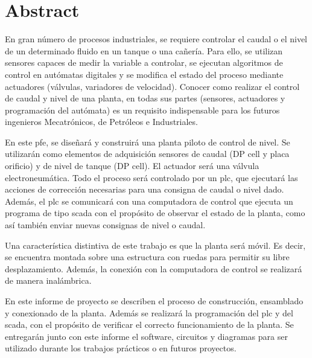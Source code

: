 \markboth{}{}
\pagestyle{empty}

\chapter*{Abstract}

En gran número de procesos industriales, se requiere controlar el caudal o el
nivel de un determinado fluido en un tanque o una cañería.
Para ello, se utilizan sensores capaces de medir la variable a
controlar, se ejecutan algoritmos de control en autómatas digitales y se
modifica el estado del proceso mediante actuadores (válvulas, variadores de
velocidad).
Conocer como realizar el control de caudal y nivel de una planta, en todas sus
partes (sensores, actuadores y programación del autómata) es un requisito
indispensable para los futuros ingenieros Mecatrónicos, de Petróleos e
Industriales.

En este \gls{pfe}, se diseñará y construirá una planta piloto de control de
nivel.
Se utilizarán como elementos de adquisición sensores de caudal (DP cell y placa
orificio) y de nivel de tanque (DP cell).
El actuador será una válvula electroneumática.
Todo el proceso será controlado por un \gls{plc}, que ejecutará las acciones de
corrección necesarias para una consigna de caudal o nivel dado.
Además, el \gls{plc} se comunicará con una computadora de control que ejecuta
un programa de tipo \gls{scada} con el propósito de observar el estado de la
planta, como así también enviar nuevas consignas de nivel o
caudal.

Una característica distintiva de este trabajo es que la planta será móvil.
Es decir, se encuentra montada sobre una estructura con ruedas para permitir su
libre desplazamiento.
Además, la conexión con la computadora de control se realizará de manera
inalámbrica.

En este informe de proyecto se describen el proceso de construcción,
ensamblado y conexionado de la planta.
Además se realizará la programación del \gls{plc} y del \gls{scada}, con el
propósito de verificar el correcto funcionamiento de la planta.
Se entregarán junto con este informe el software, circuitos y diagramas para
ser utilizado durante los trabajos prácticos o en futuros proyectos.
